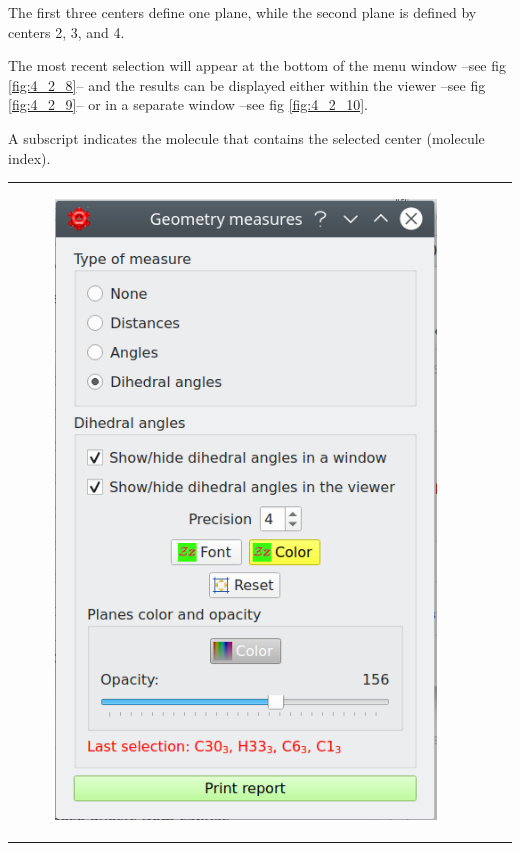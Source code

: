 \documentclass[10pt]{article}
\begin{document}
The first three centers define one plane, while the second plane is  
defined by centers 2, 3, and 4.  

The most recent selection will appear at the bottom of the menu window --see fig \ref{fig:4_2_8}--  
and the results can be displayed either within the viewer --see fig \ref{fig:4_2_9}--  
or in a separate window --see fig \ref{fig:4_2_10}.  

A subscript indicates the molecule that contains the selected center (molecule index).  


\hspace*{0mm}
\begin{tabular}{lcr}
\begin{minipage}{.2\linewidth}
\begin{figure}[H]
    \begin{center}
        \includegraphics[width=.82\linewidth]{damqt320_dihedrals_1.png}

\end{center}
\end{figure}
\end{minipage}
\end{tabular}
\end{document}
